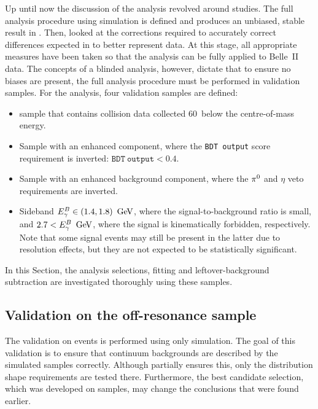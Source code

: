 Up until now the discussion of the analysis revolved around \MC studies.
The full analysis procedure using simulation is defined and produces an unbiased, stable result in .
Then,  looked at the corrections required to accurately correct differences expected in \MC to better represent data.
At this stage, all appropriate measures have been taken so that the analysis can be fully applied to Belle~II data.
The concepts of a blinded analysis, however, dictate that to ensure no biases are present, the full analysis procedure must be performed in validation samples.
For the \BtoXsgamma analysis, four validation samples are defined:
\begin{itemize}
    \item \epem\ra\qqbar sample that contains collision data collected 60~\mev below the \FourS centre-of-mass energy.
    \item Sample with an enhanced \epem\ra\qqbar component, where the \texttt{BDT~output} score requirement is inverted: $\mathtt{BDT~output}<0.4$.
    \item Sample with an enhanced \BB background component, where the $\pi^0$ and $\eta$ veto requirements are inverted.
    \item Sideband ${E^B_{\gamma}}\in(1.4,1.8)~\mathrm{\,Ge\kern -0.1em V}$, where the signal-to-background ratio is small, and \mbox{$2.7<{E^B_{\gamma}}~\mathrm{\,Ge\kern -0.1em V}$}, where the signal is kinematically forbidden, respectively.
    Note that some signal events may still be present in the latter due to resolution effects, but they are not expected to be statistically significant.
\end{itemize}
In this Section, the analysis selections, \Mbc fitting and leftover-\BB background subtraction are investigated thoroughly using these samples.

\subsection{Validation on the \texorpdfstring{\epem\ra\qqbar}{e+e- -> qqbar} off-resonance sample}\label{sec:continuum_spectrum_validation}

The validation on \epem\ra\qqbar events is performed using only \epem\ra\qqbar simulation.
The goal of this validation is to ensure that continuum backgrounds are described by the simulated samples correctly.
Although  partially ensures this, only the distribution shape requirements are tested there.
Furthermore, the best candidate selection, which was developed on \BB samples, may change the conclusions that were found earlier.

